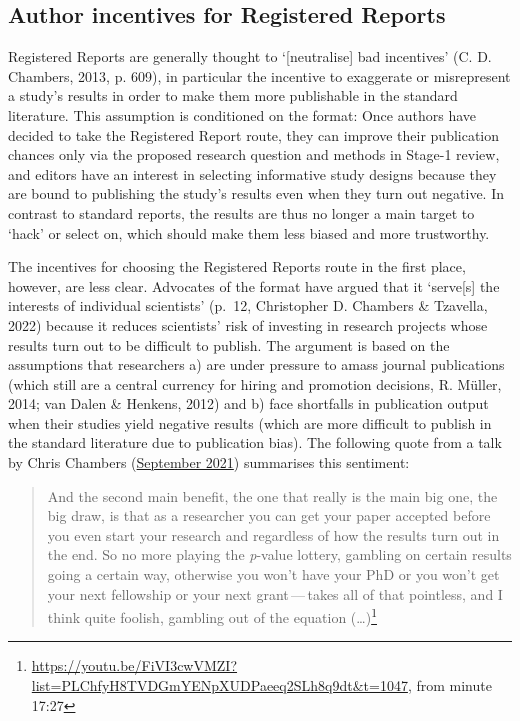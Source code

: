 \documentclass[
  ,man,mask,floatsintext]{apa6}
\begin{document}
\hypertarget{author-incentives-for-registered-reports}{%
\subsection{Author incentives for Registered Reports}\label{author-incentives-for-registered-reports}}

Registered Reports are generally thought to `{[}neutralise{]} bad incentives' (C. D. Chambers, 2013, p. 609), in particular the incentive to exaggerate or misrepresent a study's results in order to make them more publishable in the standard literature.
This assumption is conditioned on the format:
Once authors have decided to take the Registered Report route, they can improve their publication chances only via the proposed research question and methods in Stage-1 review, and editors have an interest in selecting informative study designs because they are bound to publishing the study's results even when they turn out negative.
In contrast to standard reports, the results are thus no longer a main target to `hack' or select on, which should make them less biased and more trustworthy.

The incentives for choosing the Registered Reports route in the first place, however, are less clear.
Advocates of the format have argued that it `serve{[}s{]} the interests of individual scientists' (p.~12, Christopher D. Chambers \& Tzavella, 2022) because it reduces scientists' risk of investing in research projects whose results turn out to be difficult to publish.
The argument is based on the assumptions that researchers a) are under pressure to amass journal publications (which still are a central currency for hiring and promotion decisions, R. Müller, 2014; van Dalen \& Henkens, 2012) and b) face shortfalls in publication output when their studies yield negative results (which are more difficult to publish in the standard literature due to publication bias).
The following quote from a talk by Chris Chambers (\href{https://youtu.be/FiVI3cwVMZI?list=PLChfyH8TVDGmYENpXUDPaeeq2SLh8q9dt\&t=1047}{September 2021}) summarises this sentiment:

\begin{quote}
And the second main benefit, the one that really is the main big one, the big draw, is that as a researcher you can get your paper accepted before you even start your research and regardless of how the results turn out in the end. So no more playing the \emph{p}-value lottery, gambling on certain results going a certain way, otherwise you won't have your PhD or you won't get your next fellowship or your next grant\(\,\)---\(\,\)takes all of that pointless, and I think quite foolish, gambling out of the equation (\ldots)\footnote{\url{https://youtu.be/FiVI3cwVMZI?list=PLChfyH8TVDGmYENpXUDPaeeq2SLh8q9dt\&t=1047}, from minute 17:27}
\end{quote}
\end{document}
